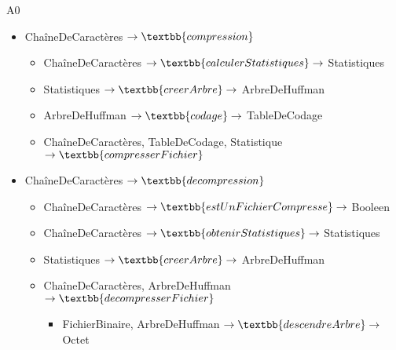 A0 
\begin{itemize}
	\item ChaîneDeCaractères $\rightarrow\textbb{compression}$
    \begin{itemize}
		\item ChaîneDeCaractères $\rightarrow\textbb{calculerStatistiques}\rightarrow$ Statistiques
		\item Statistiques $\rightarrow\textbb{creerArbre}\rightarrow$ ArbreDeHuffman
		\item ArbreDeHuffman $\rightarrow\textbb{codage}\rightarrow$ TableDeCodage
		\item ChaîneDeCaractères, TableDeCodage, Statistique $\rightarrow\textbb{compresserFichier}$
    \end{itemize}
	\item ChaîneDeCaractères $\rightarrow\textbb{decompression}$ 
    \begin{itemize}
        \item ChaîneDeCaractères $\rightarrow\textbb{estUnFichierCompresse}\rightarrow$ Booleen
		\item ChaîneDeCaractères $\rightarrow\textbb{obtenirStatistiques}\rightarrow$ Statistiques
		\item Statistiques $\rightarrow\textbb{creerArbre}\rightarrow$ ArbreDeHuffman
		\item ChaîneDeCaractères, ArbreDeHuffman $\rightarrow\textbb{decompresserFichier}$
        \begin{itemize}
            \item FichierBinaire, ArbreDeHuffman $\rightarrow\textbb{descendreArbre}\rightarrow$ Octet
        \end{itemize}
    \end{itemize}
\end{itemize}  

